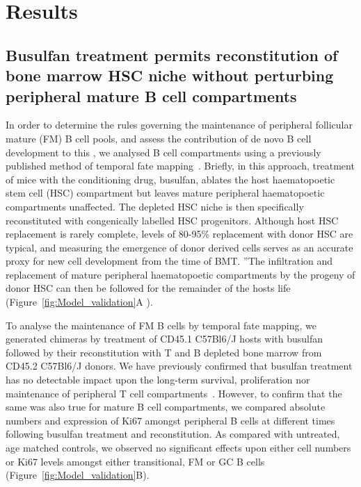 \documentclass[11pt,onecolumn]{article}
\newcommand{\red}[1]{{\color{red}{#1}}}
\begin{document}
\clearpage
\section*{Results}
\subsection*{Busulfan treatment permits reconstitution of bone marrow HSC niche without perturbing peripheral mature B cell compartments}
In order to determine the rules governing the maintenance of peripheral follicular mature (FM) B cell pools, and assess the contribution of de novo B cell development to this , we analysed B cell compartments using a previously published method of temporal fate mapping~\citep{Hogan:2015bd}. Briefly, in this approach, treatment of mice with the conditioning drug, busulfan, ablates the host haematopoetic stem cell (HSC) compartment but leaves mature peripheral haematopoetic compartments unaffected. The depleted HSC niche is then specifically reconstituted with congenically labelled HSC progenitors. Although host HSC replacement is rarely complete, levels of 80-95\% replacement with donor  HSC are typical, and measuring the emergence of donor derived cells serves as an accurate proxy for new cell development from the time of BMT. \red{Do we need to say this? it makes us look more approximate than we are... as long as we normalise to the BM or transitionals, it doesn't matter what chimerism we achieve!} ''The infiltration and replacement of mature peripheral haematopoetic compartments by the progeny of donor HSC can then be followed for the remainder of the hosts life (Figure~\ref{fig:Model_validation}A ). 

To analyse the maintenance of FM B cells by temporal fate mapping, we generated chimeras by treatment of CD45.1 C57Bl6/J hosts with busulfan followed by their reconstitution with T and B depleted bone marrow from CD45.2 C57Bl6/J donors. We have previously confirmed that busulfan treatment has no detectable impact upon the long-term survival, proliferation nor maintenance of peripheral T cell compartments~\citep{Gossel:2017iu,Hogan:2015bd}. However, to confirm that the same was also true for mature B cell compartments, we compared absolute numbers and expression of Ki67 amongst peripheral B cells at different times following busulfan treatment  and  reconstitution.  As compared with untreated, age matched controls, we observed no significant effects upon either cell numbers or Ki67 levels amongst either transitional, FM or GC B cells (Figure~\ref{fig:Model_validation}B).
\end{document}
